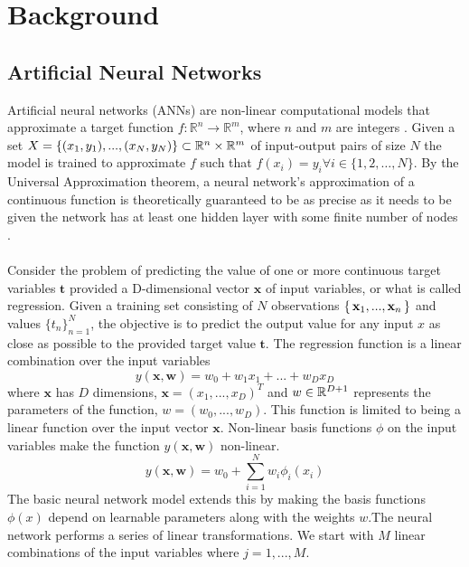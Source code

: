 \chapter{Background}
\label{ch1}

\minitoc 

\section{Artificial Neural Networks}
Artificial neural networks (ANNs) are non-linear computational models that approximate 
a target function   $f: \mathbb{R}^n \rightarrow \mathbb{R}^m$, where $n$ and $m$ are 
integers \cite{Bis:06}. Given a set $X = \{ (x_1, y_1), ..., (x_N, y_N) \} \subset \mathbb R^n \times \mathbb R^m$
of input-output pairs of size $N$ the model is trained to approximate $f$ such that 
$f(x_i) = y_i \forall i \in \{1, 2, \ldots, N\}$. By the Universal Approximation theorem, 
a neural network's approximation of a continuous function is theoretically guaranteed to be 
as precise as it needs to be given the network has at least one hidden layer with some 
finite number of nodes \cite{HorStiWhi:89}. \\\\
Consider the problem of predicting the value of one or more continuous target variables 
$\mathbf{t}$ provided a D-dimensional vector $\mathbf{x}$ of input variables, or what 
is called regression. Given a training set consisting of $N$ observations 
$\set{ \mathbf{x}_1, ..., \mathbf{x}_n }$ and values $\{t_n\}_{n=1}^N$, the 
objective is to predict the output value for any input $x$ as close as possible to 
the provided target value $\mathbf{t}$. The regression function is a linear combination 
over the input variables 
\begin{equation} 
    y(\mathbf{x},\mathbf{w}) = w_0 + w_1x_1 + ... + w_Dx_D
\end{equation}
where $\mathbf{x}$ has $D$ dimensions, $\mathbf{x} = (x_1, ..., x_D)^T$ and $w \in \mathbb R^{D+1}$ represents the parameters of the function, $w = (w_0, ..., w_D)$. This function is limited to being a linear function over the input vector $\mathbf{x}$. Non-linear basis functions $\phi$ on the input variables make the function $y\left(\mathbf{x}, \mathbf{w}\right)$ non-linear.
\begin{equation} 
    y(\mathbf{x},\mathbf{w}) = w_0 + \sum_{i=1}^{N} w_i \phi_i\left(x_i\right)
\end{equation}
The basic neural network model extends this by making the basis functions $\phi\left(x\right)$ depend on learnable parameters along with the weights $w$.The neural network performs a series of linear transformations. We start with $M$ linear combinations of the input variables where $j = 1, ..., M$.
